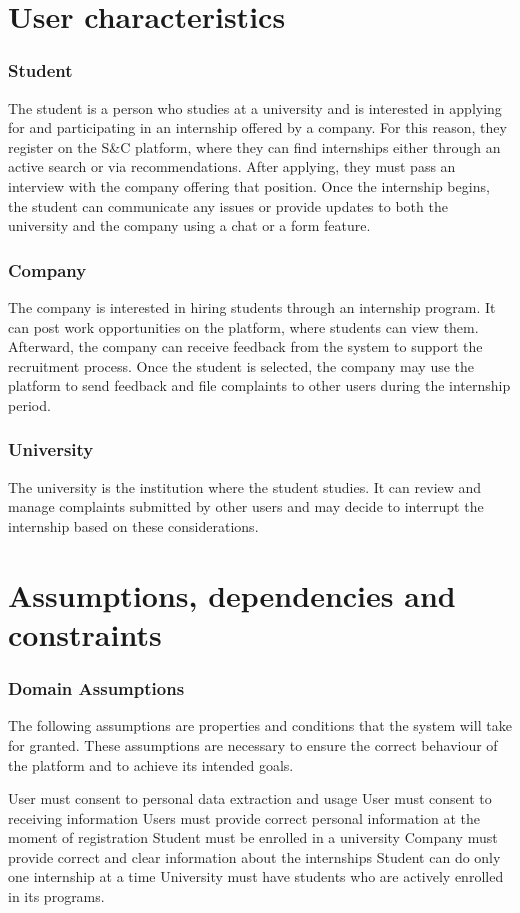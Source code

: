 \section{User characteristics}

\subsubsection*{Student}
The student is a person who studies at a university and is interested in applying for and participating in an internship offered by a company. For this reason, they register on the S\&C platform, where they can find internships either through an active search or via recommendations. After applying, they must pass an interview with the company offering that position. Once the internship begins, the student can communicate any issues or provide updates to both the university and the company using a chat or a form feature.
\subsubsection*{Company}
The company is interested in hiring students through an internship program. It can post work opportunities on the platform, where students can view them. Afterward, the company can receive feedback from the system to support the recruitment process. Once the student is selected, the company may use the platform to send feedback and file complaints to other users during the internship period.
\subsubsection*{University}
The university is the institution where the student studies. It can review and manage complaints submitted by other users and may decide to interrupt the internship based on these considerations.


\section{Assumptions, dependencies and constraints}

\subsubsection*{Domain Assumptions}
The following assumptions are properties and conditions that the system will take for granted. These assumptions are necessary to ensure the correct behaviour of the platform and to achieve its intended goals.
\begin{domainlist}
    \item User must consent to personal data extraction and usage
    \itemdb User must consent to receiving information
    \itemdc Users must provide correct personal
    information at the moment of registration
    \itemdd Student must be enrolled in a university
    \itemde Company must provide correct and clear information about the internships
    \itemdf Student can do only one internship at a time 
    \itemdg University must have students who are actively enrolled in its programs.

\end{domainlist}